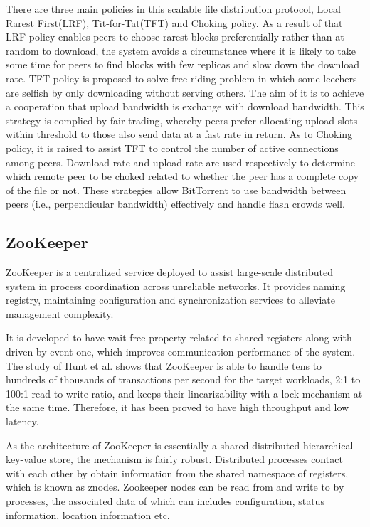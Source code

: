 \documentclass[conference]{IEEEtran}
\begin{document}
	There are three main policies in this scalable file distribution protocol, Local Rarest First(LRF), Tit-for-Tat(TFT) and Choking policy. As a result of that LRF policy enables peers to choose rarest blocks preferentially rather than at random to download, the system avoids a circumstance where it is likely to take some time for peers to find blocks with few replicas and slow down the download rate. TFT policy is proposed to solve free-riding problem in which some leechers are selfish by only downloading without serving others. The aim of it is to achieve a cooperation that upload bandwidth is exchange with download bandwidth. This strategy is complied by fair trading, whereby peers prefer allocating upload slots within threshold to those also send data at a fast rate in return. As to Choking policy, it is raised to assist TFT to control the number of active connections among peers. Download rate and upload rate are used respectively to determine which remote peer to be choked related to whether the peer has a complete copy of the file or not. These strategies allow BitTorrent to use bandwidth between peers (i.e., perpendicular bandwidth) effectively\cite{Analyzing} and handle flash crowds well.
	
	\subsection{ZooKeeper}
	ZooKeeper is a centralized service deployed to assist large-scale distributed system in process coordination across unreliable networks. It provides naming registry, maintaining configuration and synchronization services to alleviate management complexity. 
	
	It is developed to have wait-free property related to shared registers along with driven-by-event one, which improves communication performance of the system. The study of Hunt et al. shows that ZooKeeper is able to handle tens to hundreds of thousands of transactions per second for the target workloads, 2:1 to 100:1 read to write ratio\cite{ZooKeeper}, and keeps their linearizability with a lock mechanism at the same time. Therefore, it has been proved to have high throughput and low latency.
	
	As the architecture of ZooKeeper is essentially a shared distributed hierarchical key-value store, the mechanism is fairly robust. Distributed processes contact with each other by obtain information from the shared namespace of registers, which is known as znodes\cite{Apache}. Zookeeper nodes can be read from and write to by processes, the associated data of which can includes configuration, status information, location information etc. 
	
\end{document}
